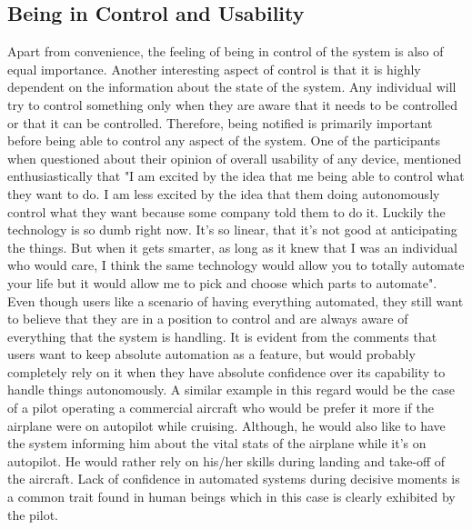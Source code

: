 \subsection{Being in Control and Usability}
Apart from convenience, the feeling of being in control of the system is also of equal importance. Another interesting aspect of control is that it is highly dependent on the information about the state of the system. Any individual will try to control something only when they are aware that it needs to be controlled or that it can be controlled. Therefore, being notified is primarily important before being able to control any aspect of the system. One of the participants when questioned about their opinion of overall usability of any device, mentioned enthusiastically that "I am excited by the idea that me being able to control what they want to do. I am less excited by the idea that them doing autonomously control what they want because some company told them to do it. Luckily the technology is so dumb right now. It's so linear, that it's not good at anticipating the things. But when it gets smarter, as long as it knew that I was an individual who would care, I think the same technology would allow you to totally automate your life but it would allow me to pick and choose which parts to automate". Even though users like a scenario of having everything automated, they still want to believe that they are in a position to control and are always aware of everything that the system is handling. It is evident from the comments that users want to keep absolute automation as a feature, but would probably completely rely on it when they have absolute confidence over its capability to handle things autonomously. A similar example in this regard would be the case of a pilot operating a commercial aircraft who would be prefer it more if the airplane were on autopilot while cruising. Although, he would also like to have the system informing him about the vital stats of the airplane while it's on autopilot. He would rather rely on his/her skills during landing and take-off of the aircraft. Lack of confidence in automated systems during decisive moments is a common trait found in human beings which in this case is clearly exhibited by the pilot.

